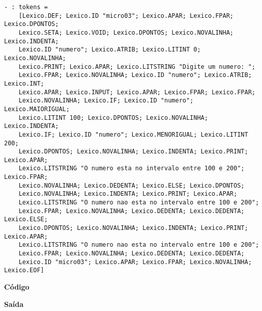 \documentclass[hidelinks,12pt]{article}
\begin{document}
	\begin{lstlisting}[caption=Analisador Léxico]
	- : tokens =
	[Lexico.DEF; Lexico.ID "micro03"; Lexico.APAR; Lexico.FPAR; Lexico.DPONTOS;
	Lexico.SETA; Lexico.VOID; Lexico.DPONTOS; Lexico.NOVALINHA; Lexico.INDENTA;
	Lexico.ID "numero"; Lexico.ATRIB; Lexico.LITINT 0; Lexico.NOVALINHA;
	Lexico.PRINT; Lexico.APAR; Lexico.LITSTRING "Digite um numero: ";
	Lexico.FPAR; Lexico.NOVALINHA; Lexico.ID "numero"; Lexico.ATRIB; Lexico.INT;
	Lexico.APAR; Lexico.INPUT; Lexico.APAR; Lexico.FPAR; Lexico.FPAR;
	Lexico.NOVALINHA; Lexico.IF; Lexico.ID "numero"; Lexico.MAIORIGUAL;
	Lexico.LITINT 100; Lexico.DPONTOS; Lexico.NOVALINHA; Lexico.INDENTA;
	Lexico.IF; Lexico.ID "numero"; Lexico.MENORIGUAL; Lexico.LITINT 200;
	Lexico.DPONTOS; Lexico.NOVALINHA; Lexico.INDENTA; Lexico.PRINT; Lexico.APAR;
	Lexico.LITSTRING "O numero esta no intervalo entre 100 e 200"; Lexico.FPAR;
	Lexico.NOVALINHA; Lexico.DEDENTA; Lexico.ELSE; Lexico.DPONTOS;
	Lexico.NOVALINHA; Lexico.INDENTA; Lexico.PRINT; Lexico.APAR;
	Lexico.LITSTRING "O numero nao esta no intervalo entre 100 e 200";
	Lexico.FPAR; Lexico.NOVALINHA; Lexico.DEDENTA; Lexico.DEDENTA; Lexico.ELSE;
	Lexico.DPONTOS; Lexico.NOVALINHA; Lexico.INDENTA; Lexico.PRINT; Lexico.APAR;
	Lexico.LITSTRING "O numero nao esta no intervalo entre 100 e 200";
	Lexico.FPAR; Lexico.NOVALINHA; Lexico.DEDENTA; Lexico.DEDENTA;
	Lexico.ID "micro03"; Lexico.APAR; Lexico.FPAR; Lexico.NOVALINHA; Lexico.EOF]
	\end{lstlisting}
	
	
	{\large \textbf{Código} }
			
	
	{\large \textbf{Saída}}
	
\end{document}
